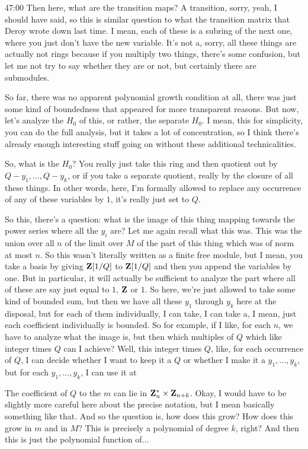 \begin{unfinished}{47:00}
Then here, what are the transition maps? A transition, sorry, yeah, I should have said, so this is similar question to what the transition matrix that Deroy wrote down last time. I mean, each of these is a subring of the next one, where you just don't have the new variable. It's not a, sorry, all these things are actually not rings because if you multiply two things, there's some confusion, but let me not try to say whether they are or not, but certainly there are submodules.

So far, there was no apparent polynomial growth condition at all, there was just some kind of boundedness that appeared for more transparent reasons. But now, let's analyze the $H_0$ of this, or rather, the separate $H_0$. I mean, this for simplicity, you can do the full analysis, but it takes a lot of concentration, so I think there's already enough interesting stuff going on without these additional technicalities.

So, what is the $H_0$? You really just take this ring and then quotient out by $Q - y_1, \dots, Q - y_k$, or if you take a separate quotient, really by the closure of all these things. In other words, here, I'm formally allowed to replace any occurrence of any of these variables by $1$, it's really just set to $Q$.

So this, there's a question: what is the image of this thing mapping towards the power series where all the $y_i$ are? Let me again recall what this was. This was the union over all $n$ of the limit over $M$ of the part of this thing which was of norm at most $n$. So this wasn't literally written as a finite free module, but I mean, you take a basis by giving $\mathbf Z[1/Q]$ to $\mathbf Z[1/Q]$ and then you append the variables by one. But in particular, it will actually be sufficient to analyze the part where all of these are say just equal to $1$, $\mathbf Z$ or $1$. So here, we're just allowed to take some kind of bounded sum, but then we have all these $y_1$ through $y_k$ here at the disposal, but for each of them individually, I can take, I can take a, I mean, just each coefficient individually is bounded. So for example, if I like, for each $n$, we have to analyze what the image is, but then which multiples of $Q$ which like integer times $Q$ can I achieve? Well, this integer times $Q$, like, for each occurrence of $Q$, I can decide whether I want to keep it a $Q$ or whether I make it a $y_1,...,y_k$, but for each $y_1,...,y_k$, I can use it at

The coefficient of $Q$ to the $m$ can lie in $\mathbf Z_n^* \times \mathbf Z_{n+k}$. Okay, I would have to be slightly more careful here about the precise notation, but I mean basically something like that. And so the question is, how does this grow? How does this grow in $m$ and in $M$? This is precisely a polynomial of degree $k$, right? And then this is just the polynomial function of...


\end{unfinished}
